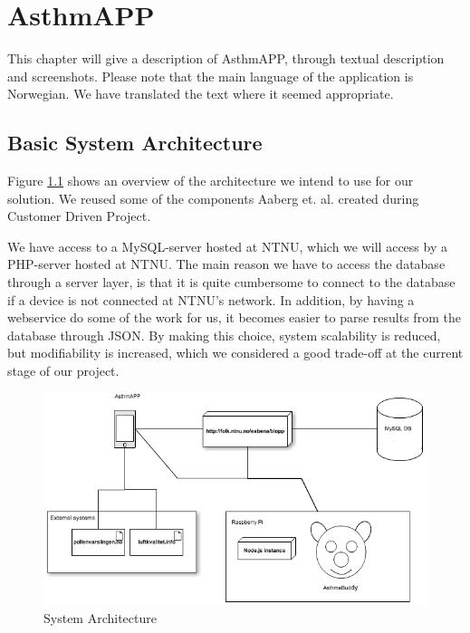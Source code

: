 \chapter{AsthmAPP}
\label{chp:description}

This chapter will give a description of AsthmAPP, through textual description and screenshots. Please note that the main language of the application is Norwegian. We have translated the text where it seemed appropriate. 

\section{Basic System Architecture}
\label{sec:architecture}
Figure \ref{fig:basic-architecture} shows an overview of the architecture we intend to use for our solution. We reused some of the components Aaberg et. al. created during Customer Driven Project\cite{CustomerDriven}. 

We have access to a MySQL-server hosted at NTNU, which we will access by a PHP-server hosted at NTNU. The main reason we have to access the database through a server layer, is that it is quite cumbersome to connect to the database if a device is not connected at NTNU's network. In addition, by having a webservice do some of the work for us, it becomes easier to parse results from the database through JSON. By making this choice, system scalability is reduced, but modifiability is increased, which we considered a good trade-off at the current stage of our project.    

\begin{figure}
		\centering
			\includegraphics[width=0.60\paperwidth]{Pictures/system-architecture.png}
		\caption{System Architecture}
		\label{fig:basic-architecture}
\end{figure}

